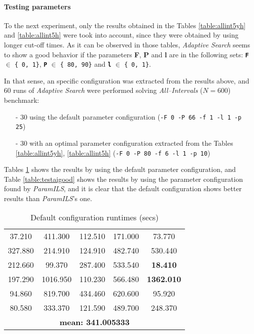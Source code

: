\paragraph{ Testing parameters}

To the next experiment, only the results obtained in the Tables \ref{table:allint5yh} and \ref{table:allint5h} were took into account, since they were obtained by using longer cut-off times. As it can be observed in those tables, {\it Adaptive Search} seems to show a good behavior if the parameters {\bf F}, {\bf P} and {\bf l} are in the following sets: \texttt{\bf F} $\in$ \texttt{\{ 0, 1\}}, \texttt{\bf P} $\in$ \texttt{\{ 80, 90\}} and \texttt{\bf l} $\in$ \texttt{\{ 0, 1\}}.


In that sense, an specific configuration was extracted from the results above, and 60 runs of {\it Adaptive Search} were performed solving {\it All--Intervals} ($N = 600$) benchmark:
\begin{itemize}
	\item[-] 30 using the default parameter configuration (\texttt{-F 0 -P 66 -f 1 -l 1 -p 25})
	\item[-] 30 with an optimal parameter configuration extracted from the Tables \ref{table:allint5yh}, \ref{table:allint5h} (\texttt{-F 0 -P 80 -f 6 -l 1 -p 10}) 
\end{itemize}

Tables \ref{table:testaibad} shows the results by using the default parameter configuration, and Table \ref{table:testaigood} shows the results by using the parameter configuration found by {\it ParamILS}, and it is clear that the default configuration shows better results than {\it ParamILS}'s one.

\begin{table}[H]
\caption{Default configuration runtimes (secs)}
\centering
\renewcommand{\arraystretch}{1.2}
\begin{tabular}{|ccccc|}
	\hline
	37.210 & 411.300 & 112.510 & 171.000 & 73.770 \\ 
	327.880 & 214.910 & 124.910 & 482.740 & 530.440 \\  
	\hline 
	212.660 & 99.370 & 287.400 & 533.540 & \textcolor{naranja}{\bf 18.410} \\ 
	197.290 & 1016.950 & 110.230 & 566.480 & \textcolor{intenso}{\bf 1362.010} \\  
	\hline 
	94.860 & 819.700 & 434.460 & 620.600 & 95.920 \\ 
	80.580 & 333.370 & 121.590 & 489.700 & 248.370 \\  
	\hline 
	\multicolumn{5}{|c|}{\bf mean: 341.005333}\\
	\hline
\end{tabular}
\label{table:testaibad}
\end{table}
	
